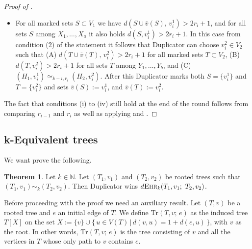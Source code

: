 \documentclass[12pt,notitlepage,a4paper]{article}
\theoremstyle{definition}
\newtheorem{theorem}{Theorem}[section]
\newcommand{\N}{\mathbb{N}}
\newcommand{\ehr}{\textsc{Ehr}}
\begin{document}
\begin{proof}[Proof of ]
\begin{itemize}[leftmargin=*]
		Thus, by definition, for some orderings $\overline{w}$, 
		$\overline{z}$ of the vertices in $S$ and $T$ respectively,
		Duplicator wins
		\[
		d\ehr_{k-i+1}\left( \,
		N(\overline{w};3r_i+1), \overline{w};
		\quad
		N(\overline{z};3r_i+1), \overline{z}
		\, \right).		
		\]
		Then Duplicator can choose $v^2_i\in V_2$ according 
		to a winning strategy for this game. After this Duplicator
		marks both $S$ and $T$ and sets 
		$\overline{v}(S):=v^1_i$, and 
		$\overline{v}(T):=v^2_i$. Notice
		that because of  now
		\[
		\left(H_1, (S,\overline{v}(S))\right)\simeq_{k-i,r_i}
		\left(H_2, (T,\overline{v}(T))\right).
		\]
		\item For all marked sets $S\subset V_1$ we have
		$d(S\cup \overline{v}(S), \, v^1_i)>2r_i +1$, and
		for all sets $S$ among $X_1,\dots, X_a$ it also holds
		$d(S,v^1_i)> 2r_i+1$. In this case
		from condition (2) of the statement it follows that
		Duplicator can choose
		$v^2_i\in V_2$ such that
		(A)
		$d(T\cup \overline{v}(T),\, v^2_i)>2r_i+1$ for all
		marked sets $T\subset V_2$, (B)
		$d(T, v^2_i)> 2r_i+1$ for all sets $T$ among
		$Y_1,\dots, Y_b$, and (C) 
		$(H_1,v^1_i)\simeq_{k-i,r_i} (H_2, v^2_i)$.
		After this Duplicator marks both $S=\{
		v^1_i\}$ and $T=\{v^2_i\}$ and sets
		$\overline{v}(S):=v^1_i$, and
		$\overline{v}(T):=v^2_i$. 		
	\end{itemize}	 
	The fact that conditions
	(i) to (iv) still hold at the end of the round
	follows from comparing $r_{i-1}$ and $r_{i}$ as well 
	as applying  and .

\end{proof}




\subsection{k-Equivalent trees} \label{sect:equivtrees}



We want prove the following.

\begin{theorem} \label{thm:equivalenttrees} 
	Let $k\in \N$. 
	Let $(T_1,v_1)$ and $(T_2,v_2)$ be rooted trees such
	that $(T_1,v_1)\sim_k (T_2,v_2)$.
	Then Duplicator wins
	$d\ehr_{k}(T_1,v_1;\, \, T_2,v_2)$.
\end{theorem}

Before proceeding with the proof we need  an auxiliary
result. Let $(T,v)$ be a rooted tree and $e$ an 
initial edge of $T$. We define $\mathrm{Tr}(T,v;\, e)$ as
the induced tree $T[X]$ on the set
$X:=\{v\} \cup \{\, u\in V(T) \, | \, d(v,u) = 1 + d(e,u) \,\}$,
with $v$ as the root. In other words, 
$\mathrm{Tr}\left(T,v;\, e\right)$ is the tree consisting of 
$v$ and all the vertices
in $T$ whose only path to $v$ contains $e$. 
\end{document}
